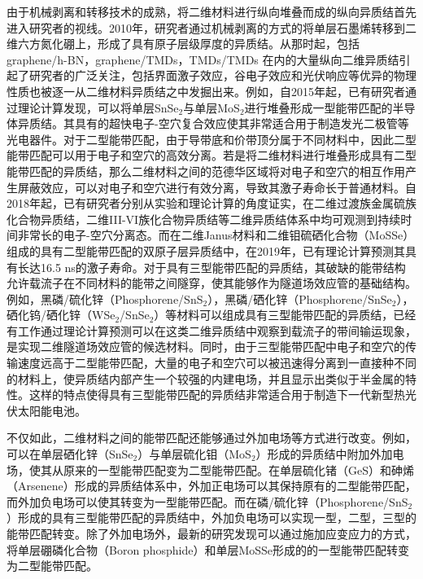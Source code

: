     由于机械剥离和转移技术的成熟，将二维材料进行纵向堆叠而成的纵向异质结首先进入研究者的视线。2010年，研究者通过机械剥离的方式的将单层石墨烯转移到二维六方氮化硼上，形成了具有原子层级厚度的异质结。从那时起，包括 graphene/h-BN，graphene/TMDs，TMDs/TMDs 在内的大量纵向二维异质结引起了研究者的广泛关注，包括界面激子效应，谷电子效应和光伏响应等优异的物理性质也被逐一从二维材料异质结之中发掘出来。例如，自2015年起，已有研究者通过理论计算发现，可以将单层SnSe$_2$与单层MoS$_2$进行堆叠形成一型能带匹配的半导体异质结。其具有的超快电子-空穴复合效应使其非常适合用于制造发光二极管等光电器件。对于二型能带匹配，由于导带底和价带顶分属于不同材料中，因此二型能带匹配可以用于电子和空穴的高效分离。若是将二维材料进行堆叠形成具有二型能带匹配的异质结，那么二维材料之间的范德华区域将对电子和空穴的相互作用产生屏蔽效应，可以对电子和空穴进行有效分离，导致其激子寿命长于普通材料。自2018年起，已有研究者分别从实验和理论计算的角度证实，在二维过渡族金属硫族化合物异质结，二维III-VI族化合物异质结等二维异质结体系中均可观测到持续时间非常长的电子-空穴分离态。而在二维Janus材料和二维钼硫硒化合物（MoSSe）组成的具有二型能带匹配的双原子层异质结中，在2019年，已有理论计算预测其具有长达16.5 ns的激子寿命。对于具有三型能带匹配的异质结，其破缺的能带结构允许载流子在不同材料的能带之间隧穿，使其能够作为隧道场效应管的基础结构。例如，黑磷/硫化锌（Phosphorene/SnS$_2$），黑磷/硒化锌（Phosphorene/SnSe$_2$），硒化钨/硒化锌（WSe$_2$/SnSe$_2$）等材料可以组成具有三型能带匹配的异质结，已经有工作通过理论计算预测可以在这类二维异质结中观察到载流子的带间输运现象，是实现二维隧道场效应管的候选材料。同时，由于三型能带匹配中电子和空穴的传输速度远高于二型能带匹配，大量的电子和空穴可以被迅速得分离到一直接种不同的材料上，使异质结内部产生一个较强的内建电场，并且显示出类似于半金属的特性。这样的特点使得具有三型能带匹配的异质结非常适合用于制造下一代新型热光伏太阳能电池。

    不仅如此，二维材料之间的能带匹配还能够通过外加电场等方式进行改变。例如，可以在单层硒化锌（SnSe$_2$）与单层硫化钼（MoS$_2$）形成的异质结中附加外加电场，使其从原来的一型能带匹配变为二型能带匹配。在单层硫化锗（GeS）和砷烯（Arsenene）形成的异质结体系中，外加正电场可以其保持原有的二型能带匹配，而外加负电场可以使其转变为一型能带匹配。而在磷/硫化锌（Phosphorene/SnS$_2$）形成的具有三型能带匹配的异质结中，外加负电场可以实现一型，二型，三型的能带匹配转变。除了外加电场外，最新的研究发现可以通过施加应变应力的方式，将单层硼磷化合物（Boron phosphide）和单层MoSSe形成的的一型能带匹配转变为二型能带匹配。

